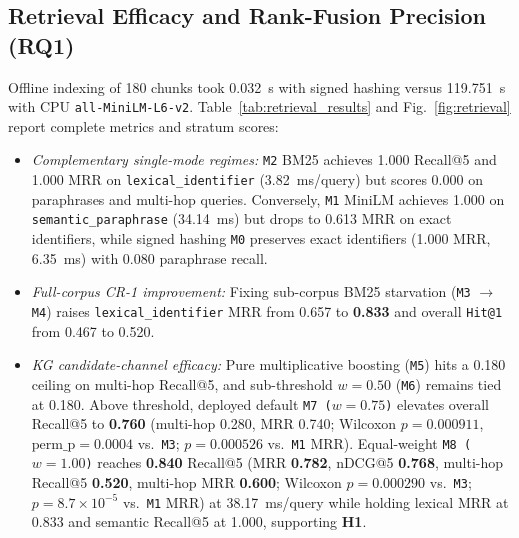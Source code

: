 \documentclass[conference]{IEEEtran}
\begin{document}
\subsection{Retrieval Efficacy and Rank-Fusion Precision (RQ1)}
Offline indexing of 180 chunks took 0.032~s with signed hashing versus 119.751~s with CPU \texttt{all-MiniLM-L6-v2}. Table~\ref{tab:retrieval_results} and Fig.~\ref{fig:retrieval} report complete metrics and stratum scores:
\begin{itemize}
  \item \emph{Complementary single-mode regimes:} \texttt{M2} BM25 achieves 1.000 Recall@5 and 1.000 MRR on \texttt{lexical\_identifier} (3.82~ms/query) but scores 0.000 on paraphrases and multi-hop queries. Conversely, \texttt{M1} MiniLM achieves 1.000 on \texttt{semantic\_paraphrase} (34.14~ms) but drops to 0.613 MRR on exact identifiers, while signed hashing \texttt{M0} preserves exact identifiers (1.000 MRR, 6.35~ms) with 0.080 paraphrase recall.
  \item \emph{Full-corpus CR-1 improvement:} Fixing sub-corpus BM25 starvation (\texttt{M3} $\rightarrow$ \texttt{M4}) raises \texttt{lexical\_identifier} MRR from 0.657 to \textbf{0.833} and overall \texttt{Hit@1} from 0.467 to 0.520.
  \item \emph{KG candidate-channel efficacy:} Pure multiplicative boosting (\texttt{M5}) hits a 0.180 ceiling on multi-hop Recall@5, and sub-threshold $w{=}0.50$ (\texttt{M6}) remains tied at 0.180. Above threshold, deployed default \texttt{M7 ($w{=}0.75$)} elevates overall Recall@5 to \textbf{0.760} (multi-hop 0.280, MRR 0.740; Wilcoxon $p{=}0.000911$, $\text{perm\_p}{=}0.0004$ vs.\ \texttt{M3}; $p{=}0.000526$ vs.\ \texttt{M1} MRR). Equal-weight \texttt{M8 ($w{=}1.00$)} reaches \textbf{0.840} Recall@5 (MRR \textbf{0.782}, nDCG@5 \textbf{0.768}, multi-hop Recall@5 \textbf{0.520}, multi-hop MRR \textbf{0.600}; Wilcoxon $p{=}0.000290$ vs.\ \texttt{M3}; $p{=}8.7\times 10^{-5}$ vs.\ \texttt{M1} MRR) at 38.17~ms/query while holding lexical MRR at 0.833 and semantic Recall@5 at 1.000, supporting \textbf{H1}.
\end{itemize}
\end{document}
